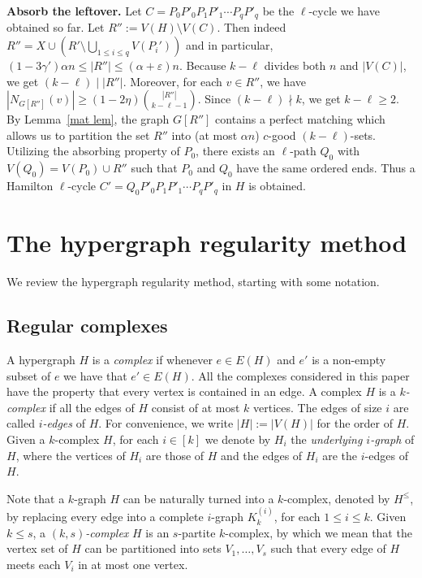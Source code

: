 \documentclass[11pt, reqno]{amsart}    	%
\theoremstyle{definition}
\numberwithin{equation}{section}
\begin{document}
	\textbf{Absorb the leftover.} Let $C = P_{0}P'_{0}P_{1}P'_{1}\cdots P_{q}P'_{q}$ be the $\ell$-cycle we have obtained so far.  Let $R'' := V(H)\setminus V(C)$. Then indeed $ R''=X\cup(R'\setminus\bigcup_{1\le i\le q}V(P_i'))  $ and in particular, $(1- 3\gamma')\alpha n \le|R''| \le (\alpha+\varepsilon)n$. Because $k-\ell$ divides both $ n $ and $|V(C)|$, we get $(k-\ell) \mid|R''|$. 
	Moreover,  for each $v \in R''$, we have $|N_{G[R'']}(v)| \ge (1-2\eta)\binom{| R''|}{k-\ell-1}$.
	Since $(k-\ell)\nmid k$, we get $k-\ell \ge 2$. 
	By Lemma~\ref{mat lem}, the graph $G[R'']$ contains a perfect matching which allows us to partition the set $R''$ into (at most $\alpha n$) $c$-good $(k-\ell )$-sets. %
	Utilizing the absorbing property of $ P_0 $, there exists an $\ell$-path $Q_{0}$ with  $V(Q_{0})= V(P_{0}) \cup R''$ such that  $P_0$ and $Q_{0}$ have the same ordered ends. Thus a Hamilton $\ell$-cycle  $C' = Q_{0}P'_{0}P_{1}P'_{1}\cdots P_{q}P'_{q}$ in $H$ is obtained.
	
	\section{The hypergraph regularity method }
	
	We review the hypergraph regularity method, starting with some notation.
	\subsection{Regular complexes}
	A hypergraph $H$ is a \emph{complex} if whenever $e \in E(H)$ and $e'$ is a non-empty subset of $e$ we have that $e'\in E(H)$. All the complexes considered in this paper have the property that every vertex is contained in an edge. A complex $H$ is a \emph{$k$-complex} if all the edges of $H$ consist of at most $k$ vertices. The edges of size $i$ are called \emph{$i$-edges} of $H$. For convenience, we write $|H| := |V (H)|$ for the order of $H$. 
	Given a $k$-complex $H$, for each $i \in [k]$ we denote by $H_i$ the \emph{underlying $i$-graph} of $H$, where the vertices of $H_i$ are those of $H$ and the edges of $H_i$ are the $i$-edges of $H$.
	
	Note that a $k$-graph $H$ can be naturally turned into a $k$-complex, denoted by $H^{\leq}$, by replacing every edge into a complete $i$-graph $K^{(i)}_k$, for each $1 \leq i \leq k$. 
	Given $k \leq s$, a \emph{$(k, s)$-complex} $H$ is an $s$-partite $k$-complex, by which we mean that the vertex set of $H$ can be partitioned into sets $V_1, \dots , V_s$ such that every edge of $H$ meets each $V_i$ in at most one vertex.
	
\end{document}
